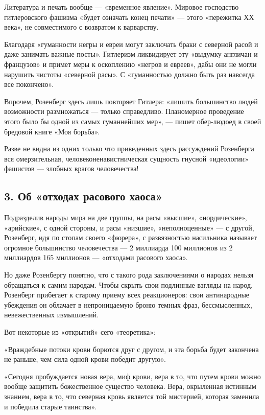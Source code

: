 \documentclass[12pt, a4paper, openany]{book}
\begin{document}
Литература и печать вообще --- «временное явление». Мировое господство гитлеровского фашизма «будет означать конец печати» — этого «пережитка ХХ века», не совместимого с возвратом к варварству.

Благодаря «гуманности негры и евреи могут заключать браки с северной расой и даже занимать важные посты». Гитлеризм ликвидирует эту «выдумку англичан и французов» и примет меры к оскоплению «негров и евреев», дабы они не могли нарушить чистоты «северной расы». С «гуманностью должно быть раз навсегда все покончено».

Впрочем, Розенберг здесь лишь повторяет Гитлера: «лишить большинство людей возможности размножаться — только справедливо. Планомерное проведение этого было бы одной из самых гуманнейших мер», — пишет обер-людоед в своей бредовой книге «Моя борьба».

Разве не видна из одних только что приведенных здесь рассуждений Розенберга вся омерзительная, человеконенавистническая сущность гнусной «идеологии» фашистов — злобных врагов человечества!


	\subsection*{\center \textbf{3. Об «отходах расового хаоса»}}


Подразделив народы мира на две группы, на расы «высшие», «нордические», «арийские», с одной стороны, и расы «низшие», «неполноценные» — с другой, Розенберг, идя по стопам своего «фюрера», с развязностью насильника называет огромное большинство человечества — 2 миллиарда 100 миллионов из 2 миллиардов 165 миллионов — «отходами расового хаоса».

Но даже Розенбергу понятно, что с такого рода заключениями о народах нельзя обращаться к самим народам. Чтобы скрыть свои подлинные взгляды на народ, Розенберг прибегает к старому приему всех реакционеров: свои антинародные убеждения он облачает в непроницаемую броню темных фраз, бессмысленных, невежественных измышлений.

Вот некоторые из «открытий» сего «теоретика»:

«Враждебные потоки крови борются друг с другом, и эта борьба будет закончена не раньше, чем сила одной крови победит другую».

«Сегодня пробуждается новая вера, миф крови, вера в то, что путем крови можно вообще защитить божественное существо человека. Вера, окрыленная истинным знанием, вера в то, что северная кровь является той мистерией, которая заменила и победила старые таинства».
	
\end{document}
